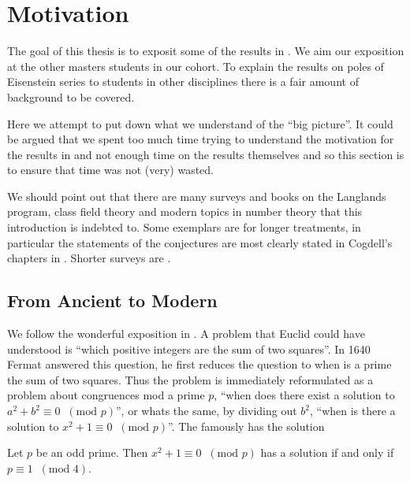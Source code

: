 \section*{Motivation}
The goal of this thesis is to exposit some of the results in \cite{jiangPolesCertainResidual2013}. We aim our exposition at the other masters students in our cohort.
To explain the results on poles of Eisenstein series to students in other disciplines there is a fair amount of background to be covered.

Here we attempt to put down what we understand of the ``big picture''. It could be argued that we spent too much time trying to understand the motivation for the results in \cite{jiangPolesCertainResidual2013} and not enough time on the results themselves and so this section is to ensure that time was not (very) wasted. 

We should point out that there are many surveys and books on the Langlands program, class field theory and modern topics in number theory that this introduction is indebted to. Some exemplars are \cite{fleigEisensteinSeriesAutomorphic2016, bumpIntroductionLanglandsProgram2004} for longer treatments, in particular the statements of the conjectures are most clearly stated in Cogdell's chapters in \cite{bumpIntroductionLanglandsProgram2004}. Shorter surveys are \cite{gelbartElementaryIntroductionLanglands1984, kimSuperficialIntroductionLanglands, langlandsFunctorialityTheoryAutomorphic, langlandsREPRESENTATIONTHEORYITS, arthurAUTOMORPHICREPRESENTATIONSNUMBER}.

\subsection{From Ancient to Modern}
We follow the wonderful exposition in \cite{weinsteinReciprocityLawsGalois2015}. A problem that Euclid could have understood is ``which positive integers are the sum of two squares''. In 1640 Fermat answered this question, he first reduces the question to when is a prime the sum of two squares. Thus the problem is immediately reformulated as a problem about congruences mod a prime \(p\), ``when does there exist a solution to \(a^2  +b^2 \equiv 0 \;\;(\text{mod }p) \)'', or whats the same, by dividing out \(b^2\), ``when is there a solution to \(x^2 + 1 \equiv 0 \;\;(\text{mod }p)\)''. The famously has the solution 
\begin{Theorem}
	Let \(p\) be an odd prime. Then \(x^2 + 1 \equiv 0 \;\;(\text{mod }p)\) has a solution if and only if \(p\equiv 1 \;\;(\text{mod }4) \).
\end{Theorem}

